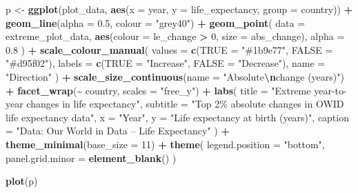 \documentclass[
  11pt,
]{article}
\newenvironment{Shaded}{\begin{snugshade}}{\end{snugshade}}
\newcommand{\AttributeTok}[1]{\textcolor[rgb]{0.13,0.29,0.53}{#1}}
\newcommand{\DecValTok}[1]{\textcolor[rgb]{0.00,0.00,0.81}{#1}}
\newcommand{\FloatTok}[1]{\textcolor[rgb]{0.00,0.00,0.81}{#1}}
\newcommand{\FunctionTok}[1]{\textcolor[rgb]{0.13,0.29,0.53}{\textbf{#1}}}
\newcommand{\NormalTok}[1]{#1}
\newcommand{\OtherTok}[1]{\textcolor[rgb]{0.56,0.35,0.01}{#1}}
\newcommand{\SpecialCharTok}[1]{\textcolor[rgb]{0.81,0.36,0.00}{\textbf{#1}}}
\newcommand{\StringTok}[1]{\textcolor[rgb]{0.31,0.60,0.02}{#1}}
\begin{document}
\begin{Shaded}
\begin{Highlighting}[]
\NormalTok{p }\OtherTok{\textless{}{-}} \FunctionTok{ggplot}\NormalTok{(plot\_data, }\FunctionTok{aes}\NormalTok{(}\AttributeTok{x =}\NormalTok{ year, }\AttributeTok{y =}\NormalTok{ life\_expectancy, }\AttributeTok{group =}\NormalTok{ country)) }\SpecialCharTok{+}
  \FunctionTok{geom\_line}\NormalTok{(}\AttributeTok{alpha =} \FloatTok{0.5}\NormalTok{, }\AttributeTok{colour =} \StringTok{"grey40"}\NormalTok{) }\SpecialCharTok{+}
  \FunctionTok{geom\_point}\NormalTok{(}
    \AttributeTok{data =}\NormalTok{ extreme\_plot\_data,}
    \FunctionTok{aes}\NormalTok{(}\AttributeTok{colour =}\NormalTok{ le\_change }\SpecialCharTok{\textgreater{}} \DecValTok{0}\NormalTok{, }\AttributeTok{size =}\NormalTok{ abs\_change),}
    \AttributeTok{alpha =} \FloatTok{0.8}
\NormalTok{  ) }\SpecialCharTok{+}
  \FunctionTok{scale\_colour\_manual}\NormalTok{(}
    \AttributeTok{values =} \FunctionTok{c}\NormalTok{(}\StringTok{\textasciigrave{}}\AttributeTok{TRUE}\StringTok{\textasciigrave{}} \OtherTok{=} \StringTok{"\#1b9e77"}\NormalTok{, }\StringTok{\textasciigrave{}}\AttributeTok{FALSE}\StringTok{\textasciigrave{}} \OtherTok{=} \StringTok{"\#d95f02"}\NormalTok{),}
    \AttributeTok{labels =} \FunctionTok{c}\NormalTok{(}\StringTok{\textasciigrave{}}\AttributeTok{TRUE}\StringTok{\textasciigrave{}} \OtherTok{=} \StringTok{"Increase"}\NormalTok{, }\StringTok{\textasciigrave{}}\AttributeTok{FALSE}\StringTok{\textasciigrave{}} \OtherTok{=} \StringTok{"Decrease"}\NormalTok{),}
    \AttributeTok{name =} \StringTok{"Direction"}
\NormalTok{  ) }\SpecialCharTok{+}
  \FunctionTok{scale\_size\_continuous}\NormalTok{(}\AttributeTok{name =} \StringTok{"Absolute}\SpecialCharTok{\textbackslash{}n}\StringTok{change (years)"}\NormalTok{) }\SpecialCharTok{+}
  \FunctionTok{facet\_wrap}\NormalTok{(}\SpecialCharTok{\textasciitilde{}}\NormalTok{ country, }\AttributeTok{scales =} \StringTok{"free\_y"}\NormalTok{) }\SpecialCharTok{+}
  \FunctionTok{labs}\NormalTok{(}
    \AttributeTok{title =} \StringTok{"Extreme year{-}to{-}year changes in life expectancy"}\NormalTok{,}
    \AttributeTok{subtitle =} \StringTok{"Top 2\% absolute changes in OWID life expectancy data"}\NormalTok{,}
    \AttributeTok{x =} \StringTok{"Year"}\NormalTok{,}
    \AttributeTok{y =} \StringTok{"Life expectancy at birth (years)"}\NormalTok{,}
    \AttributeTok{caption =} \StringTok{"Data: Our World in Data – Life Expectancy"}
\NormalTok{  ) }\SpecialCharTok{+}
  \FunctionTok{theme\_minimal}\NormalTok{(}\AttributeTok{base\_size =} \DecValTok{11}\NormalTok{) }\SpecialCharTok{+}
  \FunctionTok{theme}\NormalTok{(}
    \AttributeTok{legend.position =} \StringTok{"bottom"}\NormalTok{,}
    \AttributeTok{panel.grid.minor =} \FunctionTok{element\_blank}\NormalTok{()}
\NormalTok{  )}

\FunctionTok{plot}\NormalTok{(p)}
\end{Highlighting}
\end{Shaded}
\end{document}
